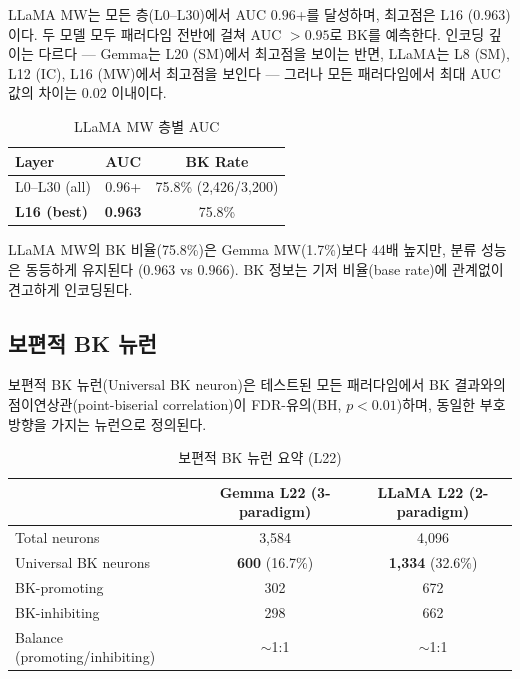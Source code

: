 \documentclass[11pt,a4paper]{article}
\begin{document}
\noindent LLaMA MW는 모든 층(L0--L30)에서 AUC $0.96$+를 달성하며, 최고점은 L16 ($0.963$)이다. 두 모델 모두 패러다임 전반에 걸쳐 AUC $> 0.95$로 BK를 예측한다. 인코딩 깊이는 다르다 --- Gemma는 L20 (SM)에서 최고점을 보이는 반면, LLaMA는 L8 (SM), L12 (IC), L16 (MW)에서 최고점을 보인다 --- 그러나 모든 패러다임에서 최대 AUC 값의 차이는 $0.02$ 이내이다.

\begin{table}[H]
\centering
\caption{LLaMA MW 층별 AUC}\label{tab:t3}
\footnotesize
\begin{tabular}{lcc}
\toprule
Layer & AUC & BK Rate \\
\midrule
L0--L30 (all) & $0.96$+ & 75.8\% (2,426/3,200) \\
\textbf{L16 (best)} & \textbf{0.963} & 75.8\% \\
\bottomrule
\end{tabular}
\end{table}

\noindent LLaMA MW의 BK 비율(75.8\%)은 Gemma MW(1.7\%)보다 44배 높지만, 분류 성능은 동등하게 유지된다 ($0.963$ vs $0.966$). BK 정보는 기저 비율(base rate)에 관계없이 견고하게 인코딩된다.

\subsection{보편적 BK 뉴런}

보편적 BK 뉴런(Universal BK neuron)은 테스트된 모든 패러다임에서 BK 결과와의 점이연상관(point-biserial correlation)이 FDR-유의(BH, $p<0.01$)하며, 동일한 부호 방향을 가지는 뉴런으로 정의된다.

\begin{table}[H]
\centering
\caption{보편적 BK 뉴런 요약 (L22)}\label{tab:t4}
\footnotesize
\begin{tabular}{lcc}
\toprule
 & Gemma L22 (3-paradigm) & LLaMA L22 (2-paradigm) \\
\midrule
Total neurons & 3,584 & 4,096 \\
Universal BK neurons & \textbf{600} (16.7\%) & \textbf{1,334} (32.6\%) \\
BK-promoting & 302 & 672 \\
BK-inhibiting & 298 & 662 \\
Balance (promoting/inhibiting) & $\sim$1:1 & $\sim$1:1 \\
\bottomrule
\end{tabular}
\end{table}
\end{document}
